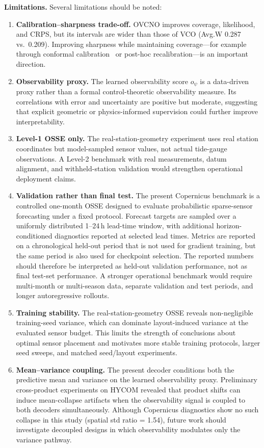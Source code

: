 \documentclass[11pt,a4paper]{article}
\begin{document}
\textbf{Limitations.} Several limitations should be noted:
\begin{enumerate}
    \item \textbf{Calibration--sharpness trade-off.} OVCNO improves coverage, likelihood, and CRPS, but its intervals are wider than those of VCO (Avg.W 0.287 vs.\ 0.209). Improving sharpness while maintaining coverage---for example through conformal calibration~\cite{feldman2023conformal} or post-hoc recalibration---is an important direction.
    \item \textbf{Observability proxy.} The learned observability score $o_\psi$ is a data-driven proxy rather than a formal control-theoretic observability measure. Its correlations with error and uncertainty are positive but moderate, suggesting that explicit geometric or physics-informed supervision could further improve interpretability.
    \item \textbf{Level-1 OSSE only.} The real-station-geometry experiment uses real station coordinates but model-sampled sensor values, not actual tide-gauge observations. A Level-2 benchmark with real measurements, datum alignment, and withheld-station validation would strengthen operational deployment claims.
    \item \textbf{Validation rather than final test.} The present Copernicus benchmark is a controlled one-month OSSE designed to evaluate probabilistic sparse-sensor forecasting under a fixed protocol. Forecast targets are sampled over a uniformly distributed 1--24\,h lead-time window, with additional horizon-conditioned diagnostics reported at selected lead times. Metrics are reported on a chronological held-out period that is not used for gradient training, but the same period is also used for checkpoint selection. The reported numbers should therefore be interpreted as held-out validation performance, not as final test-set performance. A stronger operational benchmark would require multi-month or multi-season data, separate validation and test periods, and longer autoregressive rollouts.
    \item \textbf{Training stability.} The real-station-geometry OSSE reveals non-negligible training-seed variance, which can dominate layout-induced variance at the evaluated sensor budget. This limits the strength of conclusions about optimal sensor placement and motivates more stable training protocols, larger seed sweeps, and matched seed/layout experiments.
    \item \textbf{Mean--variance coupling.} The present decoder conditions both the predictive mean and variance on the learned observability proxy. Preliminary cross-product experiments on HYCOM revealed that product shifts can induce mean-collapse artifacts when the observability signal is coupled to both decoders simultaneously. Although Copernicus diagnostics show no such collapse in this study (spatial std ratio = 1.54), future work should investigate decoupled designs in which observability modulates only the variance pathway.
\end{enumerate}
\end{document}
